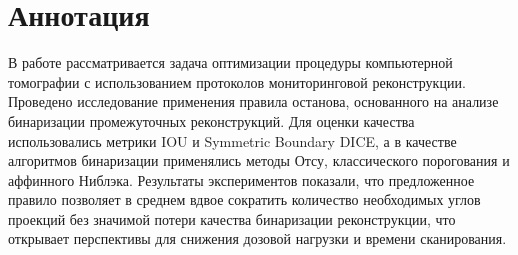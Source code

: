 \section*{Аннотация}

В работе рассматривается задача оптимизации процедуры компьютерной томографии с использованием протоколов мониторинговой реконструкции. Проведено исследование применения правила останова, основанного на анализе бинаризации промежуточных реконструкций. Для оценки качества использовались метрики IOU и Symmetric Boundary DICE, а в качестве алгоритмов бинаризации применялись методы Отсу, классического порогования и аффинного Ниблэка. Результаты экспериментов показали, что предложенное правило позволяет в среднем вдвое сократить количество необходимых углов проекций без значимой потери качества бинаризации реконструкции, что открывает перспективы для снижения дозовой нагрузки и времени сканирования.